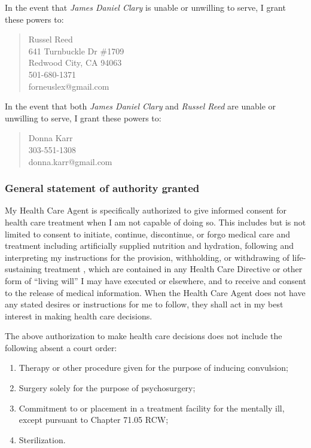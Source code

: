 \documentclass[oneside]{memoir}
\begin{document}
\vspace{1ex}

\noindent In the event that \emph{James Daniel Clary} is unable or unwilling to serve, I grant these powers to:

\begin{quote}
    Russel Reed\\
    641 Turnbuckle Dr \#1709\\
    Redwood City, CA 94063\\
    501-680-1371\\
    forneuslex@gmail.com
\end{quote}

\noindent In the event that both \emph{James Daniel Clary} and \emph{Russel Reed} are unable or unwilling to serve, I grant these powers to:

\begin{quote}
    Donna Karr\\
    303-551-1308\\
    donna.karr@gmail.com
\end{quote}

\subsubsection{General statement of authority granted}\label{general-statement-of-authority-granted}

My Health Care Agent is specifically authorized to give informed consent for health care treatment when I am not capable of doing so. This includes but is not limited to consent to initiate, continue, discontinue, or forgo medical care and treatment including artificially supplied nutrition and hydration, following and interpreting my instructions for the provision, withholding, or withdrawing of life-sustaining treatment , which are contained in any Health Care Directive or other form of ``living will'' I may have executed or elsewhere, and to receive and consent to the release of medical information. When the Health Care Agent does not have any stated desires or instructions for me to follow, they shall act in my best interest in making health care decisions.

\newpage

\noindent The above authorization to make health care decisions does not include the following absent a court order:

\begin{enumerate}
\def\labelenumi{\arabic{enumi}.}
\tightlist
\item
  Therapy or other procedure given for the purpose of inducing convulsion;
\item
  Surgery solely for the purpose of psychosurgery;
\item
  Commitment to or placement in a treatment facility for the mentally ill, except pursuant to Chapter 71.05 RCW;
\item
  Sterilization.
\end{enumerate}
\end{document}
